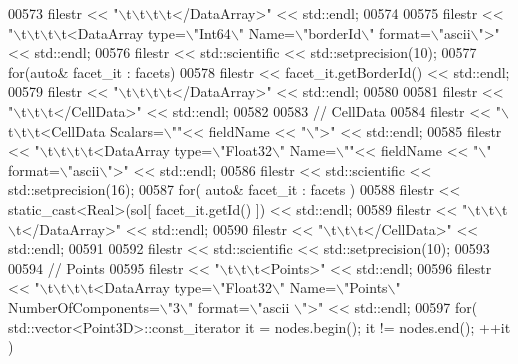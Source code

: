 \begin{DoxyCode}
00573     filestr << \textcolor{stringliteral}{"\(\backslash\)t\(\backslash\)t\(\backslash\)t\(\backslash\)t</DataArray>"} << std::endl;
00574 
00575     filestr << \textcolor{stringliteral}{"\(\backslash\)t\(\backslash\)t\(\backslash\)t\(\backslash\)t<DataArray type=\(\backslash\)"Int64\(\backslash\)" Name=\(\backslash\)"borderId\(\backslash\)" format=\(\backslash\)"ascii\(\backslash\)">"} << std::endl;
00576     filestr << std::scientific << std::setprecision(10);
00577     \textcolor{keywordflow}{for}(\textcolor{keyword}{auto}& facet\_it : facets)
00578         filestr << facet\_it.getBorderId() << std::endl;
00579     filestr << \textcolor{stringliteral}{"\(\backslash\)t\(\backslash\)t\(\backslash\)t\(\backslash\)t</DataArray>"} << std::endl;
00580 
00581     filestr << \textcolor{stringliteral}{"\(\backslash\)t\(\backslash\)t\(\backslash\)t</CellData>"} << std::endl;
00582 
00583     \textcolor{comment}{// CellData}
00584     filestr << \textcolor{stringliteral}{"\(\backslash\)t\(\backslash\)t\(\backslash\)t<CellData Scalars=\(\backslash\)""}<< fieldName << \textcolor{stringliteral}{"\(\backslash\)">"} << std::endl;
00585     filestr << \textcolor{stringliteral}{"\(\backslash\)t\(\backslash\)t\(\backslash\)t\(\backslash\)t<DataArray type=\(\backslash\)"Float32\(\backslash\)" Name=\(\backslash\)""}<< fieldName << \textcolor{stringliteral}{"\(\backslash\)" format=\(\backslash\)"ascii\(\backslash\)">"} << 
      std::endl;
00586     filestr << std::scientific << std::setprecision(16);
00587     \textcolor{keywordflow}{for}( \textcolor{keyword}{auto}& facet\_it : facets )
00588         filestr << static\_cast<Real>(sol[ facet\_it.getId() ]) << std::endl;
00589     filestr << \textcolor{stringliteral}{"\(\backslash\)t\(\backslash\)t\(\backslash\)t\(\backslash\)t</DataArray>"} << std::endl;
00590     filestr << \textcolor{stringliteral}{"\(\backslash\)t\(\backslash\)t\(\backslash\)t</CellData>"} << std::endl;
00591 
00592     filestr << std::scientific << std::setprecision(10);
00593 
00594     \textcolor{comment}{// Points}
00595     filestr << \textcolor{stringliteral}{"\(\backslash\)t\(\backslash\)t\(\backslash\)t<Points>"} << std::endl;
00596     filestr << \textcolor{stringliteral}{"\(\backslash\)t\(\backslash\)t\(\backslash\)t\(\backslash\)t<DataArray type=\(\backslash\)"Float32\(\backslash\)" Name=\(\backslash\)"Points\(\backslash\)" NumberOfComponents=\(\backslash\)"3\(\backslash\)" format=\(\backslash\)"ascii
      \(\backslash\)">"} << std::endl;
00597     \textcolor{keywordflow}{for}( std::vector<Point3D>::const\_iterator it = nodes.begin(); it != nodes.end(); ++it )

\end{DoxyCode}
